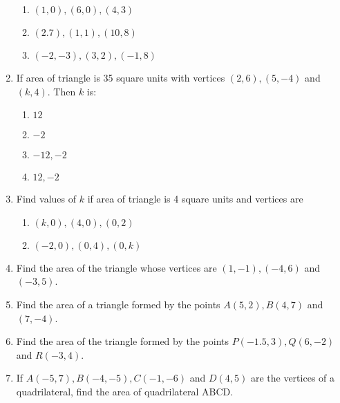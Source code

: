 \begin{enumerate}[label=\thesubsection.\arabic*,ref=\thesubsection.\theenumi]
\begin{enumerate}
\item $(1,0), (6,0), (4,3)$
\item $(2.7), (1,1), (10,8)$
\item $(-2,-3), (3,2), (-1,8)$
\end{enumerate}
\item If area of triangle is 35 square units with vertices $(2,6), (5,-4)$ and $(k,4)$. Then $k$ is:
\begin{enumerate}
\item $12$
\item $-2$
\item $-12,-2$
\item $12, -2$
\end{enumerate}
\item Find values of $k$ if area of triangle is 4 square units and vertices are
\begin{enumerate}
\item $(k,0), (4,0), (0,2)$
\item $(-2,0), (0,4), (0,k)$
\end{enumerate}
\item Find the area of the triangle whose vertices are $(1,-1), (-4,6)$ and $(-3,5)$.
\item Find the area of a triangle formed by the points $A(5,2), B(4,7)$ and $(7,-4)$.
\item Find the area of the triangle formed by the points $P(-1.5,3), Q(6,-2)$ and $R(-3,4)$.
\item If $A(-5,7), B(-4,-5), C(-1,-6)$ and $D(4,5)$ are the vertices of a quadrilateral, find the area of quadrilateral ABCD.
\end{enumerate}

